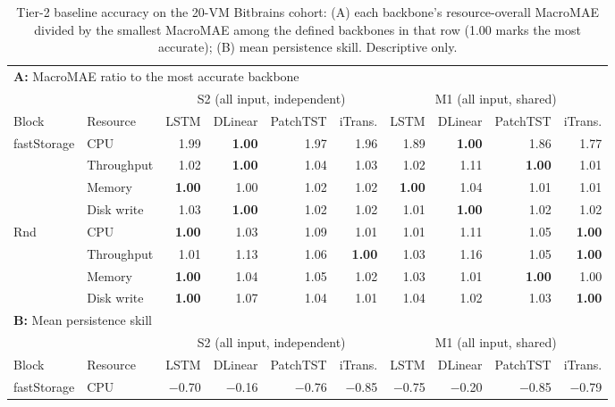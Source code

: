\documentclass[5p,twocolumn]{elsarticle}
\begin{document}
\begin{table}[t]
  \caption{Tier-2 baseline accuracy on the 20-VM Bitbrains cohort: (A) each backbone's resource-overall MacroMAE divided by the smallest MacroMAE among the defined backbones in that row (1.00 marks the most accurate); (B) mean persistence skill. Descriptive only.}
  \label{tab:tier2-baseline}
  \centering
  \small
  \setlength{\tabcolsep}{3pt}
  \begin{tabular*}{\textwidth}{@{\extracolsep{\fill}}llrrrrrrrr@{}}
    \toprule
    \multicolumn{10}{l}{\textbf{A:} MacroMAE ratio to the most accurate backbone} \\
    & & \multicolumn{4}{c}{S2 (all input, independent)} & \multicolumn{4}{c}{M1 (all input, shared)} \\
    \cmidrule(lr){3-6}\cmidrule(l){7-10}
    Block & Resource & LSTM & DLinear & PatchTST & iTrans. & LSTM & DLinear & PatchTST & iTrans. \\
    \midrule
    fastStorage & CPU & 1.99 & \textbf{1.00} & 1.97 & 1.96 & 1.89 & \textbf{1.00} & 1.86 & 1.77 \\
     & Throughput & 1.02 & \textbf{1.00} & 1.04 & 1.03 & 1.02 & 1.11 & \textbf{1.00} & 1.01 \\
     & Memory & \textbf{1.00} & 1.00 & 1.02 & 1.02 & \textbf{1.00} & 1.04 & 1.01 & 1.01 \\
     & Disk write & 1.03 & \textbf{1.00} & 1.02 & 1.02 & 1.01 & \textbf{1.00} & 1.02 & 1.02 \\
    Rnd & CPU & \textbf{1.00} & 1.03 & 1.09 & 1.01 & 1.01 & 1.11 & 1.05 & \textbf{1.00} \\
     & Throughput & 1.01 & 1.13 & 1.06 & \textbf{1.00} & 1.03 & 1.16 & 1.05 & \textbf{1.00} \\
     & Memory & \textbf{1.00} & 1.04 & 1.05 & 1.02 & 1.03 & 1.01 & \textbf{1.00} & 1.00 \\
     & Disk write & \textbf{1.00} & 1.07 & 1.04 & 1.01 & 1.04 & 1.02 & 1.03 & \textbf{1.00} \\
    \midrule
    \multicolumn{10}{l}{\textbf{B:} Mean persistence skill} \\
    & & \multicolumn{4}{c}{S2 (all input, independent)} & \multicolumn{4}{c}{M1 (all input, shared)} \\
    \cmidrule(lr){3-6}\cmidrule(l){7-10}
    Block & Resource & LSTM & DLinear & PatchTST & iTrans. & LSTM & DLinear & PatchTST & iTrans. \\
    \midrule
    fastStorage & CPU & $-$0.70 & $-$0.16 & $-$0.76 & $-$0.85 & $-$0.75 & $-$0.20 & $-$0.85 & $-$0.79 \\

\end{tabular*}
\end{table}
\end{document}

